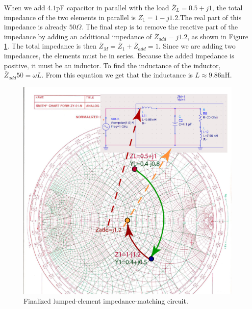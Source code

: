 \documentclass{ximera}
\begin{document}
When we add $4.1$pF capacitor in parallel with the load $\bar{Z}_L=0.5+j1$, the total impedance of the two elements in parallel is $\bar{Z}_1=1-j1.2$.The real part of this impedance is already $50\Omega$. The final step is to remove the reactive part of the impedance by adding an additional impedance of $\bar{Z}_{add}=j1.2$, as shown in Figure \ref{fig:LumpedImpM3}. The total impedance is then $\bar{Z}_M=\bar{Z}_1+\bar{Z}_{add}=1$. Since we are adding two impedances, the elements must be in series. Because the added impedance is positive, it must be an inductor. To find the inductance of the inductor, $\bar{Z}_{add} 50=\omega L$. From this equation we get that the inductance is $L \approx 9.86 $nH.



\begin{figure}[htbp]
\begin{center}
\includegraphics[scale=1]{../jpg/LumpedMatch3-01.jpg}
\end{center}
\caption{Finalized lumped-element impedance-matching circuit.}
\label{fig:LumpedImpM3}
\end{figure}
\end{document}
